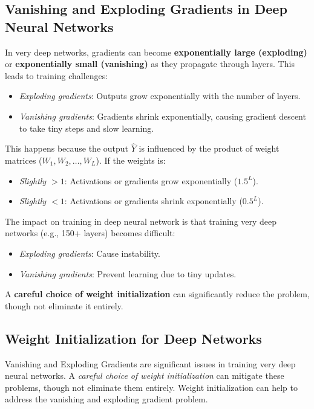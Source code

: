 \documentclass[letterpaper,12pt,notitlepage,twoside]{report}
\begin{document}
\subsection*{Vanishing and Exploding Gradients in Deep Neural Networks}
In very deep networks, gradients can become \textbf{exponentially large (exploding)} or \textbf{exponentially small (vanishing)} as they propagate through layers. This leads to training challenges:
    \begin{itemize}
        \item \textit{Exploding gradients}: Outputs grow exponentially with the number of layers.
        \item \textit{Vanishing gradients}: Gradients shrink exponentially, causing gradient descent to take tiny steps and slow learning.
    \end{itemize}

This happens because the output $\hat{Y}$ is influenced by the product of weight matrices ($W_1, W_2, \dots, W_L$). If the weights is:
    \begin{itemize}
        \item \textit{Slightly $> 1$}: Activations or gradients grow exponentially ($1.5^L$).
        \item \textit{Slightly $< 1$}: Activations or gradients shrink exponentially ($0.5^L$).
    \end{itemize}

The impact on training in deep neural network is that training very deep networks (e.g., 150+ layers) becomes difficult:
    \begin{itemize}
        \item \textit{Exploding gradients}: Cause instability.
        \item \textit{Vanishing gradients}: Prevent learning due to tiny updates.
    \end{itemize}

A \textbf{careful choice of weight initialization} can significantly reduce the problem, though not eliminate it entirely.

\subsection*{Weight Initialization for Deep Networks}
Vanishing and Exploding Gradients are significant issues in training very deep neural networks. A \textit{careful choice of weight initialization} can mitigate these problems, though not eliminate them entirely. Weight initialization can help to address the vanishing and exploding gradient problem.
\end{document}
